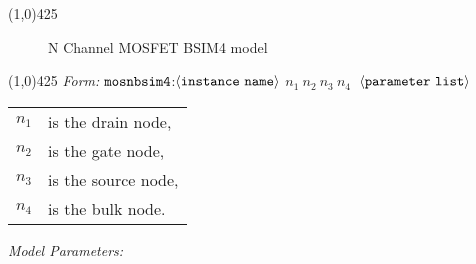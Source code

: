 \documentclass{article}
\begin{document}
\hrulefill\linethickness{0.5mm}\line(1,0){425} \normalsize
\newline
\begin{figure}[h]
\centerline{\epsfxsize=4in} \caption{N Channel MOSFET
BSIM4 model}
\end{figure}
\newline
\linethickness{0.5mm} \line(1,0){425}
\newline
\textit{Form:}
$\tt mosnbsim4$:$\langle \tt{instance\ name}\rangle$ $n_1\ n_2\
n_3\ n_4\ $ $\langle \tt{parameter\ list}\rangle$
\newline
\begin{tabular}{r l}
$n_1$ & is the drain node, \\
$n_2$ & is the gate node, \\
$n_3$ & is the source node, \\
$n_4$ & is the bulk node. \\
\end{tabular}
\newpage
\noindent\textit{Model Parameters:}
\newline
\end{document}
